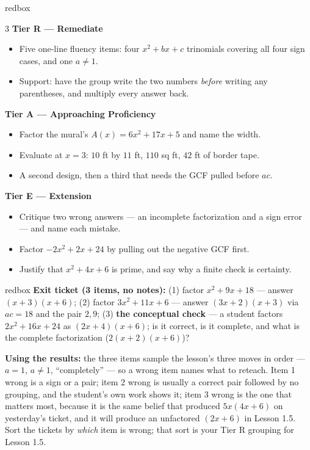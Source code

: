 \documentclass[10pt]{article}
\begin{document}
\boxguard
\begin{skillbox}{redbox}
\begin{multicols}{3}
\textbf{Tier R --- Remediate}
\begin{itemize}[leftmargin=1em, itemsep=1pt, topsep=2pt]
  \item Five one-line fluency items: four $x^2+bx+c$ trinomials covering all four sign cases, and
        one $a \ne 1$.
  \item Support: have the group write the two numbers \emph{before} writing any parentheses, and
        multiply every answer back.
\end{itemize}

\columnbreak
\textbf{Tier A --- Approaching Proficiency}
\begin{itemize}[leftmargin=1em, itemsep=1pt, topsep=2pt]
  \item Factor the mural's $A(x)=6x^2+17x+5$ and name the width.
  \item Evaluate at $x=3$: $10$ ft by $11$ ft, $110$ sq ft, $42$ ft of border tape.
  \item A second design, then a third that needs the GCF pulled before $ac$.
\end{itemize}

\columnbreak
\textbf{Tier E --- Extension}
\begin{itemize}[leftmargin=1em, itemsep=1pt, topsep=2pt]
  \item Critique two wrong answers --- an incomplete factorization and a sign error --- and name
        each mistake.
  \item Factor $-2x^2+2x+24$ by pulling out the negative GCF first.
  \item Justify that $x^2+4x+6$ is prime, and say why a finite check is certainty.
\end{itemize}
\end{multicols}
\end{skillbox}

\begin{skillbox}{redbox}
\textbf{Exit ticket (3 items, no notes):} (1) factor $x^2+9x+18$ --- answer $(x+3)(x+6)$;
(2) factor $3x^2+11x+6$ --- answer $(3x+2)(x+3)$ via $ac=18$ and the pair $2, 9$;
(3) \textbf{the conceptual check} --- a student factors $2x^2+16x+24$ as $(2x+4)(x+6)$; is it
correct, is it complete, and what is the complete factorization ($2(x+2)(x+6)$)?

\textbf{Using the results:} the three items sample the lesson's three moves in order --- $a=1$,
$a \ne 1$, ``completely'' --- so a wrong item names what to reteach. Item 1 wrong is a sign or a
pair; item 2 wrong is usually a correct pair followed by no grouping, and the student's own work
shows it; item 3 wrong is the one that matters most, because it is the same belief that produced
$5x(4x+6)$ on yesterday's ticket, and it will produce an unfactored $(2x+6)$ in Lesson 1.5. Sort
the tickets by \emph{which} item is wrong; that sort is your Tier R grouping for Lesson 1.5.
\end{skillbox}
\end{document}
